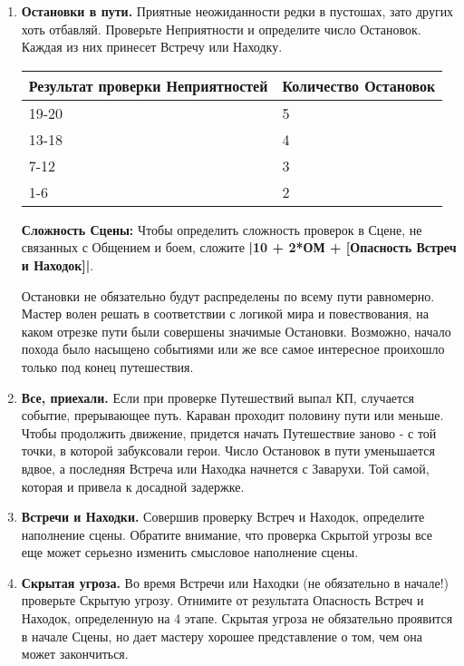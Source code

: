 \begin{enumerate}
  \item \textbf{Остановки в пути.} Приятные неожиданности редки в пустошах, зато других хоть отбавляй. Проверьте Неприятности и определите число Остановок. Каждая из них принесет Встречу или Находку.
    \begin{center} \begin{tabular}{ |p{2.7cm}|p{12cm}| } \hline
      \textbf{Результат проверки Неприятностей} & \textbf{Количество Остановок} \\ \hline
      19-20 & 5 \\ \hline
      13-18 & 4 \\ \hline
      7-12 & 3 \\ \hline
      1-6 & 2 \\ \hline
    \end{tabular} \end{center}
    \textbf{Сложность Сцены:} Чтобы определить сложность проверок в Сцене, не связанных с Общением и боем, сложите \textbf{|10 + 2*ОМ + [Опасность Встреч и Находок]|}.
    \begin{tcolorbox}
      Остановки не обязательно будут распределены по всему пути равномерно. Мастер волен решать в соответствии с логикой мира и повествования, на каком отрезке пути были совершены значимые Остановки. Возможно, начало похода было насыщено событиями или же все самое интересное проихошло только под конец путешествия.
    \end{tcolorbox}

  \item \textbf{Все, приехали.} Если при проверке Путешествий выпал КП, случается событие, прерывающее путь. Караван проходит половину пути или меньше. Чтобы продолжить движение, придется начать Путешествие заново - с той точки, в которой забуксовали герои. 
  \newline Число Остановок в пути уменьшается вдвое, а последняя Встреча или Находка начнется с Заварухи. Той самой, которая и привела к досадной задержке.

  \item \textbf{Встречи и Находки.} Совершив проверку Встреч и Находок, определите наполнение сцены. Обратите внимание, что проверка Скрытой угрозы все еще может серьезно изменить смысловое наполнение сцены.
  
  \item \textbf{Скрытая угроза.} Во время Встречи или Находки (не обязательно в начале!) проверьте Скрытую угрозу. Отнимите от результата Опасность Встреч и Находок, определенную на 4 этапе. Скрытая угроза не обязательно проявится в начале Сцены, но дает мастеру хорошее представление о том, чем она может закончиться.
  

\end{enumerate}
